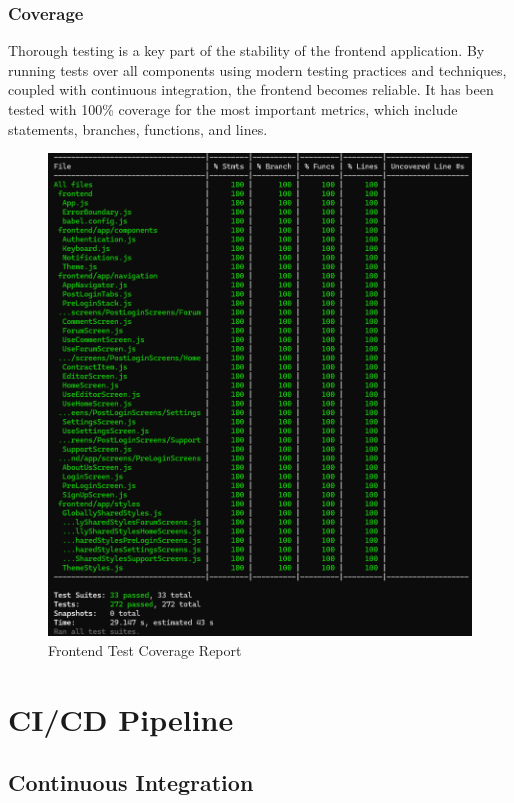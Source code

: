 \subsubsection{Coverage}

Thorough testing is a key part of the stability of the frontend application. By running tests over all components using modern testing practices and techniques, coupled with continuous integration, the frontend becomes reliable. It has been tested with 100\% coverage for the most important metrics, which include statements, branches, functions, and lines.

\begin{figure}[!ht]
    \centering
    \includegraphics[width=1\textwidth]{LATEX/Appendices/Images/Software/Frontend/frontend_testing_report.png}
    \caption{Frontend Test Coverage Report}
    \label{fig:frontend_testing}
\end{figure}

\newpage
\section{CI/CD Pipeline}

\subsection{Continuous Integration}

